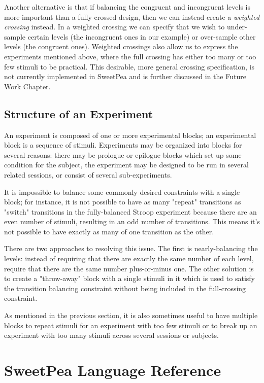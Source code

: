 Another alternative is that if balancing the congruent and incongruent levels is more important than a fully-crossed design, then we can instead create a \emph{weighted crossing} instead. In a weighted crossing we can specify that we wish to under-sample certain levels (the incongruent ones in our example) or over-sample other levels (the congruent ones). Weighted crossings also allow us to express the experiments mentioned above, where the full crossing has either too many or too few stimuli to be practical. This desirable, more general crossing specification, is not currently implemented in SweetPea and is further discussed in the Future Work Chapter.

\subsection{Structure of an Experiment}

An experiment is composed of one or more experimental blocks; an experimental block is a sequence of stimuli. Experiments may be organized into blocks for several reasons: there may be prologue or epilogue blocks which set up some condition for the subject, the experiment may be designed to be run in several related sessions, or consist of several sub-experiments.

It is impossible to balance some commonly desired constraints with a single block; for instance, it is not possible to have as many "repeat" transitions as "switch" transitions in the fully-balanced Stroop experiment because there are an even number of stimuli, resulting in an odd number of transitions. This means it's not possible to have exactly as many of one transition as the other.

There are two approaches to resolving this issue. The first is nearly-balancing the levels: instead of requiring that there are exactly the same number of each level, require that there are the same number plus-or-minus one. The other solution is to create a "throw-away" block with a single stimuli in it which is used to satisfy the transition balancing constraint without being included in the full-crossing constraint.

As mentioned in the previous section, it is also sometimes useful to have multiple blocks to repeat stimuli for an experiment with too few stimuli or to break up an experiment with too many stimuli across several sessions or subjects.

\section{SweetPea Language Reference}

